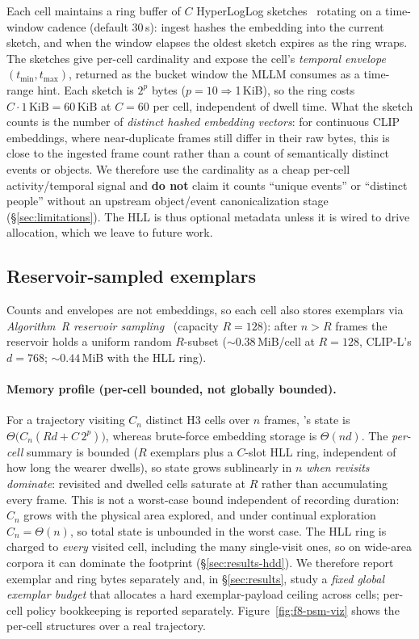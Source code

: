 Each cell maintains a ring buffer of $C$ HyperLogLog
sketches~\cite{flajolet2007hyperloglog} rotating on a time-window cadence
(default 30\,s): ingest hashes the embedding into the current sketch, and when
the window elapses the oldest sketch expires as the ring wraps. The sketches
give per-cell cardinality and expose the cell's \emph{temporal envelope}
$(t_{\min},t_{\max})$, returned as the bucket window the MLLM consumes as a
time-range hint. Each sketch is $2^p$ bytes ($p{=}10\Rightarrow$1\,KiB), so the
ring costs $C\cdot1\,\mathrm{KiB}=60\,\mathrm{KiB}$ at $C{=}60$ per cell,
independent of dwell time. What the sketch counts is the number of \emph{distinct
hashed embedding vectors}: for continuous CLIP embeddings, where near-duplicate
frames still differ in their raw bytes, this is close to the ingested frame count
rather than a count of semantically distinct events or objects. We therefore use
the cardinality as a cheap per-cell activity/temporal signal and \textbf{do not}
claim it counts ``unique events'' or ``distinct people'' without an upstream
object/event canonicalization stage (\S\ref{sec:limitations}). The HLL is thus
optional metadata unless it is wired to drive allocation, which we leave to future
work.

\subsection{Reservoir-sampled exemplars}
\label{sec:method-exemplars}

Counts and envelopes are not embeddings, so each cell also stores exemplars via
\emph{Algorithm~R reservoir sampling}~\cite{vitter1985reservoir} (capacity
$R{=}128$): after $n>R$ frames the reservoir holds a uniform random $R$-subset
(${\sim}0.38$\,MiB/cell at $R{=}128$, CLIP-L's $d{=}768$; ${\sim}0.44$\,MiB with
the HLL ring).

\paragraph{Memory profile (per-cell bounded, not globally bounded).} For a
trajectory visiting $C_n$ distinct H3 cells over $n$ frames, \psm{}'s state is
$\Theta\!\big(C_n(R d + C\,2^p)\big)$, whereas brute-force embedding storage is
$\Theta(n d)$. The \emph{per-cell} summary is bounded ($R$ exemplars plus a
$C$-slot HLL ring, independent of how long the wearer dwells), so state grows
sublinearly in $n$ \emph{when revisits dominate}: revisited and dwelled cells
saturate at $R$ rather than accumulating every frame. This is not a worst-case
bound independent of recording duration: $C_n$ grows with the physical area
explored, and under continual exploration $C_n=\Theta(n)$, so total state is
unbounded in the worst case. The HLL ring is charged to \emph{every} visited
cell, including the many single-visit ones, so on wide-area corpora it can
dominate the footprint (\S\ref{sec:results-hdd}). We therefore report exemplar
and ring bytes separately and, in \S\ref{sec:results}, study a \emph{fixed
global exemplar budget} that allocates a hard exemplar-payload ceiling across
cells; per-cell policy bookkeeping is reported separately.
Figure~\ref{fig:f8-psm-viz} shows
the per-cell structures over a real trajectory.

